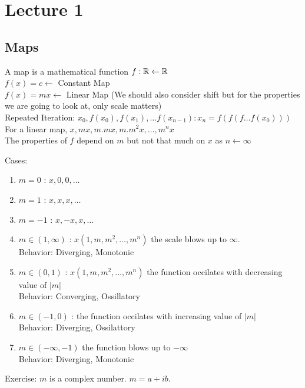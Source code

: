 \chapter{Lecture 1}

\section{Maps}

A map is a mathematical function $f: \mathbb{R} \leftarrow \mathbb{R}$\\

$f(x) = c \leftarrow$ Constant Map\\

$f(x) = mx \leftarrow$ Linear Map (We should also consider shift
but for the properties we are going to look at, only scale
matters) \\

Repeated Iteration: $x_0, f(x_0), f(x_1), \dots f(x_{n-1}) : 
x_{n} = f(f(f\dots f(x_0)))$ \\

For a linear map, $x, mx, m.mx, m.m^{2}x, \dots , m^{n}x$\\

The properties of $f$ depend on $m$ but not that much on $x$ as
$n \leftarrow \infty$

Cases:
\begin{enumerate}
    \item $m = 0$ : $x, 0, 0, \dots$
    \item $m = 1$ : $x, x, x, \dots$
    \item $m = -1$ : $x, -x, x, \dots$
    \item $m \in (1, \infty)$ : $x(1, m, m^{2}, \dots, m^{n})$ 
        the scale blows up to $\infty$.\\
        Behavior: Diverging, Monotonic
    \item $m \in (0, 1)$ : $x(1, m, m^{2}, \dots, m^{n})$
        the function occilates with decreasing value of $|m|$\\
        Behavior: Converging, Ossillatory
    \item $m \in (-1, 0)$ : 
        the function occilates with increasing value of $|m|$\\
        Behavior: Diverging, Ossilattory
    \item $m \in (-\infty, -1)$
        the function blows up to $-\infty$\\
        Behavior: Diverging, Monotonic
\end{enumerate}

Exercise: $m$ is a complex number. $m = a + ib$.
